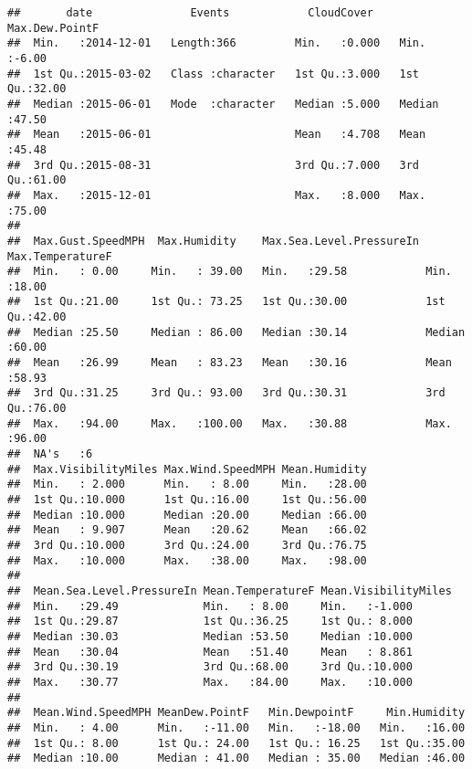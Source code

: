 \documentclass[
]{article}
\begin{document}
\begin{verbatim}
##       date               Events            CloudCover    Max.Dew.PointF 
##  Min.   :2014-12-01   Length:366         Min.   :0.000   Min.   :-6.00  
##  1st Qu.:2015-03-02   Class :character   1st Qu.:3.000   1st Qu.:32.00  
##  Median :2015-06-01   Mode  :character   Median :5.000   Median :47.50  
##  Mean   :2015-06-01                      Mean   :4.708   Mean   :45.48  
##  3rd Qu.:2015-08-31                      3rd Qu.:7.000   3rd Qu.:61.00  
##  Max.   :2015-12-01                      Max.   :8.000   Max.   :75.00  
##                                                                         
##  Max.Gust.SpeedMPH  Max.Humidity    Max.Sea.Level.PressureIn Max.TemperatureF
##  Min.   : 0.00     Min.   : 39.00   Min.   :29.58            Min.   :18.00   
##  1st Qu.:21.00     1st Qu.: 73.25   1st Qu.:30.00            1st Qu.:42.00   
##  Median :25.50     Median : 86.00   Median :30.14            Median :60.00   
##  Mean   :26.99     Mean   : 83.23   Mean   :30.16            Mean   :58.93   
##  3rd Qu.:31.25     3rd Qu.: 93.00   3rd Qu.:30.31            3rd Qu.:76.00   
##  Max.   :94.00     Max.   :100.00   Max.   :30.88            Max.   :96.00   
##  NA's   :6                                                                   
##  Max.VisibilityMiles Max.Wind.SpeedMPH Mean.Humidity  
##  Min.   : 2.000      Min.   : 8.00     Min.   :28.00  
##  1st Qu.:10.000      1st Qu.:16.00     1st Qu.:56.00  
##  Median :10.000      Median :20.00     Median :66.00  
##  Mean   : 9.907      Mean   :20.62     Mean   :66.02  
##  3rd Qu.:10.000      3rd Qu.:24.00     3rd Qu.:76.75  
##  Max.   :10.000      Max.   :38.00     Max.   :98.00  
##                                                       
##  Mean.Sea.Level.PressureIn Mean.TemperatureF Mean.VisibilityMiles
##  Min.   :29.49             Min.   : 8.00     Min.   :-1.000      
##  1st Qu.:29.87             1st Qu.:36.25     1st Qu.: 8.000      
##  Median :30.03             Median :53.50     Median :10.000      
##  Mean   :30.04             Mean   :51.40     Mean   : 8.861      
##  3rd Qu.:30.19             3rd Qu.:68.00     3rd Qu.:10.000      
##  Max.   :30.77             Max.   :84.00     Max.   :10.000      
##                                                                  
##  Mean.Wind.SpeedMPH MeanDew.PointF   Min.DewpointF     Min.Humidity  
##  Min.   : 4.00      Min.   :-11.00   Min.   :-18.00   Min.   :16.00  
##  1st Qu.: 8.00      1st Qu.: 24.00   1st Qu.: 16.25   1st Qu.:35.00  
##  Median :10.00      Median : 41.00   Median : 35.00   Median :46.00  

\end{verbatim}
\end{document}
